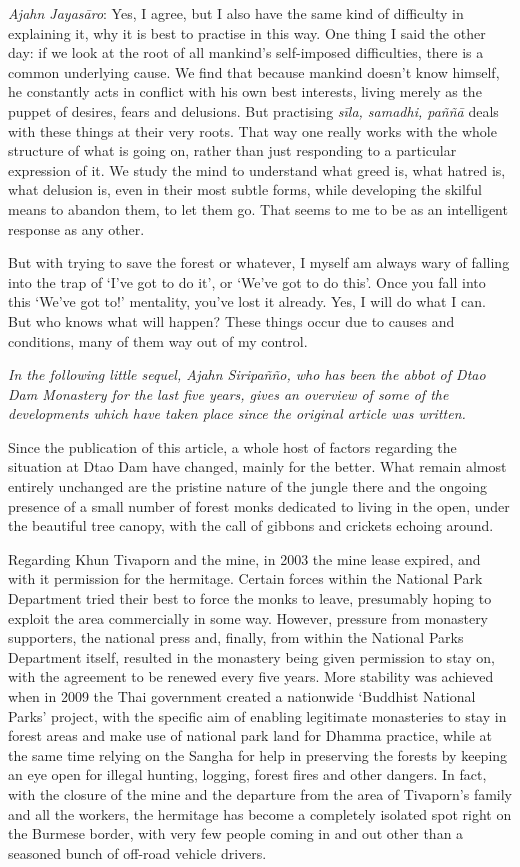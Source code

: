 \emph{Ajahn Jayasāro‎}: Yes, I agree, but I also have the same kind of
difficulty in explaining it, why it is best to practise in this way. One
thing I said the other day: if we look at the root of all mankind's
self-imposed difficulties, there is a common underlying cause. We find
that because mankind doesn't know himself, he constantly acts in
conflict with his own best interests, living merely as the puppet of
desires, fears and delusions. But practising \emph{sīla, samadhi, paññā}
deals with these things at their very roots. That way one really works
with the whole structure of what is going on, rather than just
responding to a particular expression of it. We study the mind to
understand what greed is, what hatred is, what delusion is, even in
their most subtle forms, while developing the skilful means to abandon
them, to let them go. That seems to me to be as an intelligent response
as any other.

But with trying to save the forest or whatever, I myself am always wary
of falling into the trap of `I've got to do it', or `We've got to do
this'. Once you fall into this `We've got to!' mentality, you've lost it
already. Yes, I will do what I can. But who knows what will happen?
These things occur due to causes and conditions, many of them way out of
my control.



\emph{In the following little sequel, Ajahn Siripañño, who has been the
abbot of Dtao Dam Monastery for the last five years, gives an overview
of some of the developments which have taken place since the original
article was written.}

Since the publication of this article, a whole host of factors regarding
the situation at Dtao Dam have changed, mainly for the better. What
remain almost entirely unchanged are the pristine nature of the jungle
there and the ongoing presence of a small number of forest monks
dedicated to living in the open, under the beautiful tree canopy, with
the call of gibbons and crickets echoing around.

Regarding Khun Tivaporn and the mine, in 2003 the mine lease expired,
and with it permission for the hermitage. Certain forces within the
National Park Department tried their best to force the monks to leave,
presumably hoping to exploit the area commercially in some way. However,
pressure from monastery supporters, the national press and, finally,
from within the National Parks Department itself, resulted in the
monastery being given permission to stay on, with the agreement to be
renewed every five years. More stability was achieved when in 2009 the
Thai government created a nationwide `Buddhist National Parks' project,
with the specific aim of enabling legitimate monasteries to stay in
forest areas and make use of national park land for Dhamma practice,
while at the same time relying on the Sangha for help in preserving the
forests by keeping an eye open for illegal hunting, logging, forest
fires and other dangers. In fact, with the closure of the mine and the
departure from the area of Tivaporn's family and all the workers, the
hermitage has become a completely isolated spot right on the Burmese
border, with very few people coming in and out other than a seasoned
bunch of off-road vehicle drivers.

